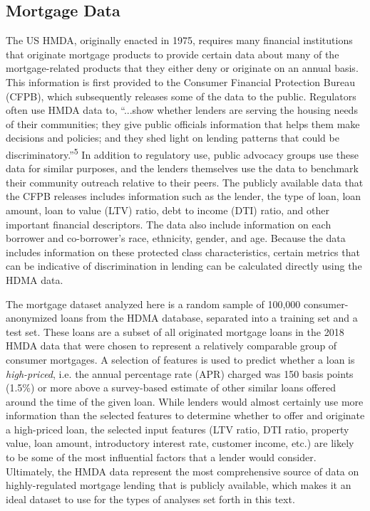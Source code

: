 \documentclass[information,article,submit,moreauthors,pdftex]{definitions/mdpi}
\begin{document}
\subsection{Mortgage Data}\label{ssec:mort_data}

The US HMDA, originally enacted in 1975, requires many financial institutions that originate mortgage products to provide certain data about many of the mortgage-related products that they either deny or originate on an annual basis. This information is first provided to the Consumer Financial Protection Bureau (CFPB), which subsequently releases some of the data to the public. Regulators often use HMDA data to, ``...show whether lenders are serving the housing needs of their communities; they give public officials information that helps them make decisions and policies; and they shed light on lending patterns that could be discriminatory.''\textsuperscript{5} In addition to regulatory use, public advocacy groups use these data for similar purposes, and the lenders themselves use the data to benchmark their community outreach relative to their peers.  The publicly available data that the CFPB releases includes information such as the lender, the type of loan, loan amount, loan to value (LTV) ratio, debt to income (DTI) ratio, and other important financial descriptors. The data also include information on each borrower and co-borrower’s race, ethnicity, gender, and age. Because the data includes information on these protected class characteristics, certain metrics that can be indicative of discrimination in lending can be calculated directly using the HDMA data. 

The mortgage dataset analyzed here is a random sample of 100,000 consumer-anonymized loans from the HDMA database, separated into a training set and a test set. These loans are a subset of all originated mortgage loans in the 2018 HMDA data that were chosen to represent a relatively comparable group of consumer mortgages.  A selection of features is used to predict whether a loan is \textit{high-priced}, i.e. the annual percentage rate (APR) charged was 150 basis points (1.5\%) or more above a survey-based estimate of other similar loans offered around the time of the given loan.  While lenders would almost certainly use more information than the selected features to determine whether to offer and originate a high-priced loan, the selected input features (LTV ratio, DTI ratio, property value, loan amount, introductory interest rate, customer income, etc.) are likely to be some of the most influential factors that a lender would consider.  Ultimately, the HMDA data represent the most comprehensive source of data on highly-regulated mortgage lending that is publicly available, which makes it an ideal dataset to use for the types of analyses set forth in this text.  
\end{document}
